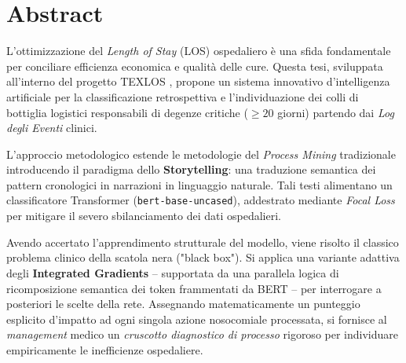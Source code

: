 \chapter{Abstract}

L'ottimizzazione del \textit{Length of Stay} (LOS) ospedaliero è una sfida fondamentale per conciliare efficienza economica e qualità delle cure. Questa tesi, sviluppata all'interno del progetto TEXLOS \cite{texlos2026}, propone un sistema innovativo d'intelligenza artificiale per la classificazione retrospettiva e l'individuazione dei colli di bottiglia logistici responsabili di degenze critiche ($\ge 20$ giorni) partendo dai \textit{Log degli Eventi} clinici.

L'approccio metodologico estende le metodologie del \textit{Process Mining} tradizionale introducendo il paradigma dello \textbf{Storytelling}: una traduzione semantica dei pattern cronologici in narrazioni in linguaggio naturale. Tali testi alimentano un classificatore Transformer (\texttt{bert-base-uncased}), addestrato mediante \textit{Focal Loss} per mitigare il severo sbilanciamento dei dati ospedalieri.

Avendo accertato l'apprendimento strutturale del modello, viene risolto il classico problema clinico della scatola nera ("black box"). Si applica una variante adattiva degli \textbf{Integrated Gradients} -- supportata da una parallela logica di ricomposizione semantica dei token frammentati da BERT -- per interrogare a posteriori le scelte della rete. Assegnando matematicamente un punteggio esplicito d'impatto ad ogni singola azione nosocomiale processata, si fornisce al \textit{management} medico un \textit{cruscotto diagnostico di processo} rigoroso per individuare empiricamente le inefficienze ospedaliere.
